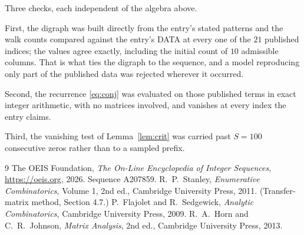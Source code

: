 \documentclass[11pt,a4paper]{article}
\theoremstyle{plain}
\theoremstyle{definition}
\begin{document}
Three checks, each independent of the algebra above.

First, the digraph was built directly from the entry's stated patterns and the walk counts
compared against the entry's DATA at every one of the $21$ published indices; the
values agree exactly, including the initial count of $10$ admissible columns. That is
what ties the digraph to the sequence, and a model reproducing only part of the published
data was rejected wherever it occurred.

Second, the recurrence \eqref{eq:conj} was evaluated on those published terms in exact
integer arithmetic, with no matrices involved, and vanishes at every index the entry claims.

Third, the vanishing test of Lemma~\ref{lem:crit} was carried past $S=100$ consecutive
zeros rather than to a sampled prefix.

\begin{thebibliography}{9}
 The OEIS Foundation, \emph{The On-Line Encyclopedia of Integer
Sequences}, \url{https://oeis.org}, 2026. Sequence A207859.
 R.~P.~Stanley, \emph{Enumerative Combinatorics}, Volume 1, 2nd ed.,
Cambridge University Press, 2011. (Transfer-matrix method, Section 4.7.)
 P.~Flajolet and R.~Sedgewick, \emph{Analytic Combinatorics}, Cambridge
University Press, 2009.
 R.~A.~Horn and C.~R.~Johnson, \emph{Matrix Analysis}, 2nd ed., Cambridge
University Press, 2013.
\end{thebibliography}
\end{document}
